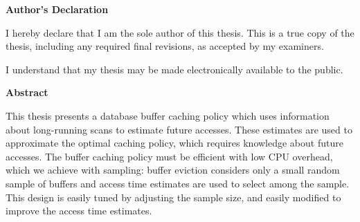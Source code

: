 

 \begin{center}\textbf{Author's Declaration}\end{center}

 \noindent
I hereby declare that I am the sole author of this thesis. This is a true copy of the thesis, including any required final revisions, as accepted by my examiners.
 \noindent  
  \bigskip
  
  \noindent
I understand that my thesis may be made electronically available to the public.

\cleardoublepage
{}    %

\begin{center}\textbf{Abstract}\end{center}



This thesis presents a database buffer caching policy which uses information about long-running scans to estimate future accesses. These estimates are used to approximate the optimal caching policy, which requires knowledge about future accesses. The buffer caching policy must be efficient with low CPU overhead, which we achieve with sampling: buffer eviction considers only a small random sample of buffers and access time estimates are used to select among the sample. This design is easily tuned by adjusting the sample size, and easily modified to improve the access time estimates.

